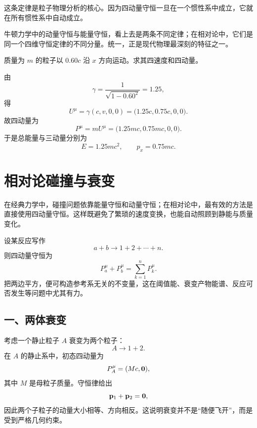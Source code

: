 这条定律是粒子物理分析的核心。因为四动量守恒一旦在一个惯性系中成立，它就在所有惯性系中自动成立。

\begin{remark}
牛顿力学中的动量守恒与能量守恒，看上去是两条不同定律；在相对论中，它们是同一个四维守恒定律的不同分量。统一，正是现代物理最深刻的特征之一。
\end{remark}

\begin{example}[四速度与四动量的计算]
质量为 $m$ 的粒子以 $0.60c$ 沿 $x$ 方向运动。求其四速度和四动量。

由
\[
\gamma=\frac{1}{\sqrt{1-0.60^2}}=1.25,
\]
得
\[
U^\mu = \gamma(c,v,0,0)=\bigl(1.25c,0.75c,0,0\bigr).
\]
故四动量为
\[
P^\mu = mU^\mu = \bigl(1.25mc,0.75mc,0,0\bigr).
\]
于是总能量与三动量分别为
\[
E=1.25mc^2,
\qquad
p_x=0.75mc.
\]
\end{example}

\section{相对论碰撞与衰变}

在经典力学中，碰撞问题依靠能量守恒和动量守恒；在相对论中，最有效的方法是直接使用四动量守恒。这样既避免了繁琐的速度变换，也能自动照顾到静能与质量变化。

设某反应写作
\[
a+b\to 1+2+\cdots+n.
\]
则四动量守恒为
\[
P_a^\mu+P_b^\mu = \sum_{k=1}^{n} P_k^\mu.
\]
把两边平方，便可构造参考系无关的不变量，这在阈值能、衰变产物能谱、反应可否发生等问题中尤其有力。

\subsection*{一、两体衰变}

考虑一个静止粒子 $A$ 衰变为两个粒子：
\[
A\to 1+2.
\]
在 $A$ 的静止系中，初态四动量为
\[
P_A^\mu=(M c,\vb{0}),
\]
其中 $M$ 是母粒子质量。守恒律给出
\[
\vb{p}_1+\vb{p}_2=\vb{0},
\]
因此两个子粒子的动量大小相等、方向相反。这说明衰变并不是“随便飞开”，而是受到严格几何约束。

\begin{center}
\end{center}

